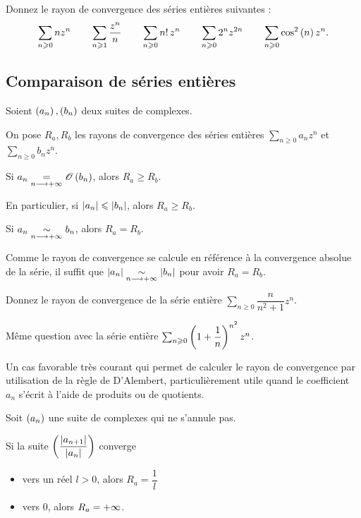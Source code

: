 \begin{exo}
Donnez le rayon de convergence des séries entières suivantes : \[\sum_{n\geqslant0}nz^n\qquad\sum_{n\geqslant1}\dfrac{z^n}{n}\qquad\sum_{n\geqslant0}n!\,z^n\qquad\sum_{n\geqslant0}2^nz^{2n}\qquad\sum_{n\geqslant0}\cos^2\left(n\right)z^n.\]
\end{exo}

\subsection{Comparaison de séries entières}

\begin{prop}
Soient \(\left(a_n\right),\left(b_n\right)\) deux suites de complexes.

On pose \(R_a,R_b\) les rayons de convergence des séries entières \(\sum_{n\geq0}a_nz^n\) et \(\sum_{n\geq0}b_nz^n\).

Si \(a_n\underset{n\longrightarrow+\infty}{=}\mathscr{O}\left(b_n\right)\), alors \(R_a\geq R_b\).

En particulier, si \(\left\lvert a_n\right\rvert\leqslant\left\lvert b_n\right\rvert\), alors \(R_a\geq R_b\).

Si \(a_n\underset{n\longrightarrow+\infty}{\sim}b_n\), alors \(R_a=R_b\).
\end{prop}

\begin{rem}
Comme le rayon de convergence se calcule en référence à la convergence absolue de la série, il suffit que \(\left\lvert a_n\right\rvert\underset{n\longrightarrow+\infty}{\sim}\left\lvert b_n\right\rvert\) pour avoir \(R_a=R_b\).
\end{rem}

\begin{exo}
Donnez le rayon de convergence de la série entière \(\sum_{n\geq0}\dfrac{n}{n^2+1}z^n\).
\end{exo}

\begin{exo}
Même question avec la série entière \(\sum_{n\geqslant0}\left(1+\dfrac{1}{n}\right)^{n^2}z^n\).
\end{exo}

Un cas favorable très courant qui permet de calculer le rayon de convergence par utilisation de la règle de D'Alembert, particulièrement utile quand le coefficient \(a_n\) s'écrit à l'aide de produits ou de quotients.

\begin{prop}
Soit \(\left(a_n\right)\) une suite de complexes qui ne s'annule pas.

Si la suite \(\left(\dfrac{\left\lvert a_{n+1}\right\rvert}{\left\lvert a_n\right\rvert}\right)\) converge

\begin{itemize}
    \item vers un réel \(l>0\), alors \(R_a=\dfrac{1}{l}\) \\
    \item vers \(0\), alors \(R_a=+\infty\).
\end{itemize}
\end{prop}

